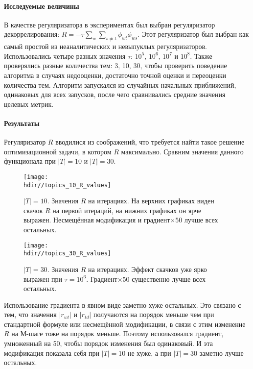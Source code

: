 \documentclass[12pt, twoside]{article}
\newcommand{\hdir}{.}
\begin{document}
\paragraph{Исследуемые величины}
В качестве регуляризатора в экспериментах был выбран регуляризатор декоррелирования: $R = - \tau \sum_w \sum_{s \neq t} \phi_{wt} \phi_{ws}$. Этот регуляризатор был выбран как самый простой из неаналитических и невыпуклых регуляризаторов. Использовались четыре разных значения $\tau$: $10^5$, $10^6$, $10^7$ и $10^8$. Также проверялись разные количества тем: 3, 10, 30, чтобы проверить поведение алгоритма в случаях недооценки, достаточно точной оценки и переоценки  количества тем. Алгоритм  запускался из случайных начальных приближений, одинаковых для всех запусков, после чего сравнивались средние значения целевых метрик.
\paragraph{Результаты}

Регуляризатор $R$  вводилися из соображений, что требуется найти такое решение оптимизационной задачи, в котором $R$ максимально. Сравним значения данного функционала при $|T| = 10$ и $|T| = 30$.

\begin{figure}[!ht]
	\centering
	\texttt{[image: \\hdir//topics\_10\_R\_values]}
	\caption{$|T| = 10$. Значения $R$ на итерациях. На верхних графиках виден скачок $R$ на первой итераций, на нижних графиках он ярче выражен. Несмещённая модификация и градиент${\times}50$  лучше всех остальных.}
\end{figure}

\begin{figure}[!ht]
	\centering  
	\texttt{[image: \\hdir//topics\_30\_R\_values]}
	\caption{$|T| = 30$. Значения $R$ на итерациях.  Эффект скачков уже ярко выражен при $\tau = 10^6$. Градиент${\times}50$ существенно лучше всех остальных.}  
\end{figure}

Использование градиента в явном виде заметно хуже остальных. Это связано с тем, что значения $|r_{wt}|$ и $|r_{td}|$ получаются на порядок меньше чем при стандартной формуле или несмещённой модификации, в связи с этим изменение $R$ на М-шаге тоже на порядок меньше. Поэтому использовался градиент, умноженный на 50, чтобы порядок изменения был одинаковый. И эта модификация показала себя при $|T| = 10$ не хуже, а при $|T| = 30$ заметно лучше остальных.
\end{document}
